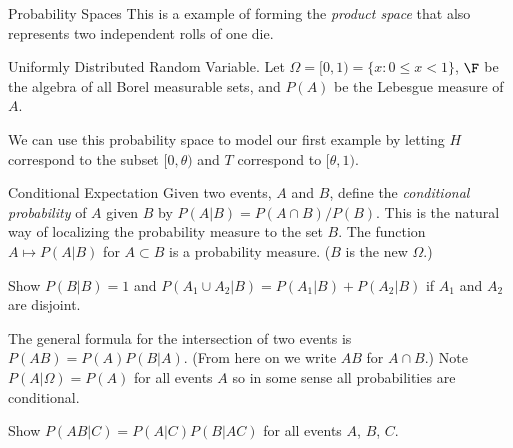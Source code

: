 \begin{section}{Probability Spaces}
This is a example of forming the {\em product space} that also represents
two independent rolls of one die. 

\begin{subsection}{Uniformly Distributed Random Variable.}
Let $\Omega = [0,1) = \{x:0\le x<1\}$, $\F$ be the algebra of all Borel measurable sets,
and $P(A)$ be the Lebesgue measure of $A$. 
\end{subsection}

We can use this probability space to model our first example by letting
$H$ correspond to the subset $[0,\theta)$ and $T$ correspond to
$[\theta, 1)$.
\end{section}

\begin{section}{Conditional Expectation}
Given two events, $A$ and $B$, define the {\em conditional probability}
of $A$ given $B$ by $P(A|B) = P(A\cap B)/P(B)$. This is the natural
way of localizing the probability measure to the set $B$. The
function $A\mapsto P(A|B)$ for $A\subset B$ is a probability measure.
($B$ is the new $\Omega$.) 
\begin{exercise}
Show $P(B|B) = 1$ and $P(A_1\cup A_2|B) = P(A_1|B) + P(A_2|B)$
if $A_1$ and $A_2$ are disjoint.
\end{exercise}

The general formula for the intersection of two events is $P(AB)
= P(A)P(B|A)$. (From here on we write $AB$ for $A\cap B$.)  Note 
$P(A|\Omega) = P(A)$ for all events $A$ so in some sense all 
probabilities are conditional.
\begin{exercise}
Show $P(AB|C) = P(A|C) P(B|AC)$ for all events $A$, $B$, $C$.
\end{exercise}

\end{section}

